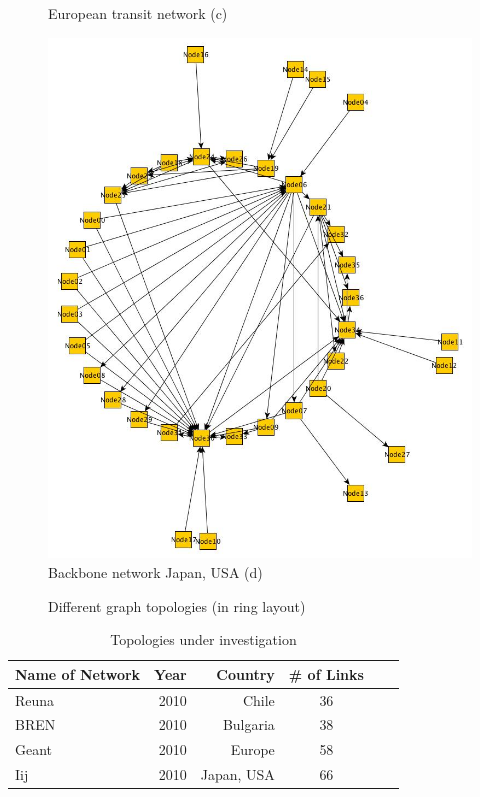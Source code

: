 \begin{figure}[h!]
\begin{minipage}[c]{0.45\textwidth}
    European transit network (c)
    \end{minipage}
    \begin{minipage}[c]{0.4\textwidth}
    \vspace{0pt}
    \includegraphics[width=\linewidth]{Iij.jpg}
    Backbone network Japan, USA (d)
    \end{minipage}
   \caption{Different graph topologies (in ring layout)}
   \label{fig:graphs}
\end{figure}
\begin{table}
\centering
\caption{Topologies under investigation}
\begin{tabular}{lrrcrr}
	\hline
	Name of Network & Year & Country & \# of Links\\%
    \hline
    Reuna & 2010 & Chile & 36\\%
    BREN & 2010 & Bulgaria & 38\\%
    Geant & 2010 & Europe & 58\\%
    Iij & 2010 & Japan, USA & 66\\%
    \hline
\end{tabular}
\label{table:network}
\end{table}

